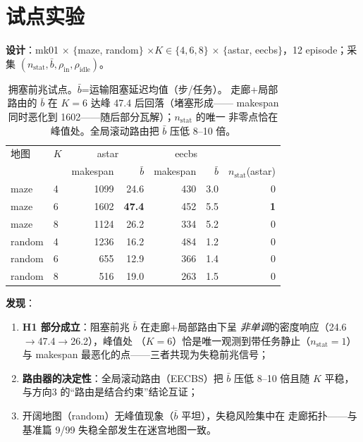 \documentclass[UTF8,12pt,a4paper]{ctexart}
\begin{document}
\section{试点实验}\label{sec:pilot}

\textbf{设计}：mk01 $\times$ $\{$maze, random$\}$ $\times K\in\{4,6,8\}$
$\times$ $\{$astar, eecbs$\}$，12 episode；采集
$(n_{\mathrm{stat}}, \bar b, \rho_{\mathrm{in}}, \rho_{\mathrm{idle}})$。

\begin{table}[h]
\centering
\begin{tabular}{llrrrrr}
\toprule
地图 & $K$ & \multicolumn{2}{c}{astar} & \multicolumn{2}{c}{eecbs} & \\
 & & makespan & $\bar b$ & makespan & $\bar b$ & $n_{\mathrm{stat}}$(astar) \\
\midrule
maze & 4 & 1099 & 24.6 & 430 & 3.0 & 0 \\
maze & 6 & 1602 & \textbf{47.4} & 452 & 5.5 & \textbf{1} \\
maze & 8 & 1124 & 26.2 & 334 & 5.2 & 0 \\
random & 4 & 1236 & 16.2 & 484 & 1.2 & 0 \\
random & 6 & 655 & 12.9 & 366 & 1.4 & 0 \\
random & 8 & 516 & 19.0 & 263 & 1.5 & 0 \\
\bottomrule
\end{tabular}
\caption{拥塞前兆试点。$\bar b$=运输阻塞延迟均值（步/任务）。
走廊+局部路由的 $\bar b$ 在 $K{=}6$ 达峰 47.4 后回落（堵塞形成——
makespan 同时恶化到 1602——随后部分瓦解）；$n_{\mathrm{stat}}$ 的唯一
非零点恰在峰值处。全局滚动路由把 $\bar b$ 压低 8--10 倍。}
\label{tab:deadlock}
\end{table}

\textbf{发现}：
\begin{enumerate}
  \item \textbf{H1 部分成立}：阻塞前兆 $\bar b$ 在走廊+局部路由下呈
    \emph{非单调}的密度响应（24.6$\to$47.4$\to$26.2），峰值处
    （$K{=}6$）恰是唯一观测到带任务静止（$n_{\mathrm{stat}}{=}1$）与
    makespan 最恶化的点——三者共现为失稳前兆信号；
  \item \textbf{路由器的决定性}：全局滚动路由（EECBS）把 $\bar b$ 压低
    8--10 倍且随 $K$ 平稳，与方向3 的``路由是结合约束''结论互证；
  \item 开阔地图（random）无峰值现象（$\bar b$ 平坦），失稳风险集中在
    走廊拓扑——与基准篇 9/99 失稳全部发生在迷宫地图一致。
\end{enumerate}
\end{document}
